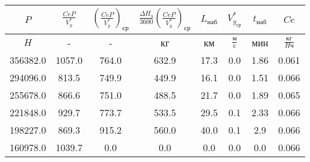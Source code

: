 \begin{tabular}{|c|c|c|c|c|c|c|c|}
\hline
$P$ & $\frac{CeP}{V_y^*}$ & $(\frac{CeP}{V_y^*})_{ср}$ & $\frac{\Delta H_э}{3600}(\frac{CeP}{V_y^*})_{ср}$ & $L_{наб}$ & $V_{y_{ср}}^*$ & $t_{наб}$ & $Ce$ \\ 
\hline
$H$ & - & - & кг & км & $\frac{м}{с}$ & мин & $\frac{кг}{H ч}$ \\ 
\hline
356382.0 & 1057.0 & 764.0 & 632.9 & 17.3 & 0.0 & 1.86 & 0.061 \\ 
\hline
294096.0 & 813.5 & 749.9 & 449.9 & 16.1 & 0.0 & 1.51 & 0.066 \\ 
\hline
255678.0 & 866.6 & 751.0 & 488.5 & 21.7 & 0.0 & 1.89 & 0.065 \\ 
\hline
221848.0 & 929.7 & 773.7 & 533.5 & 29.5 & 0.1 & 2.33 & 0.066 \\ 
\hline
198227.0 & 869.3 & 915.2 & 560.0 & 40.0 & 0.1 & 2.9 & 0.066 \\ 
\hline
160978.0 & 1039.7 & 0.0 & 0.0 & 0.0 & 0.0 & 0.0 & 0.066 \\ 
\hline
\end{tabular}